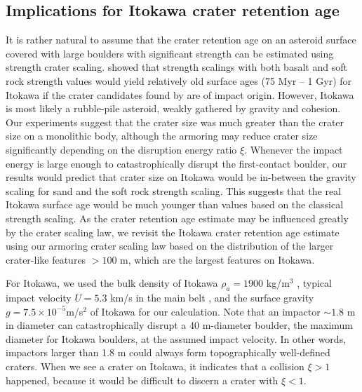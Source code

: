 \documentclass[3p,authoryear]{elsarticle}
\begin{document}
 \subsection{Implications for Itokawa crater retention age}\label{sec:itokawa-age}
It is rather natural to assume that the crater retention age on an asteroid surface covered with large boulders with significant strength can be estimated using strength crater scaling. \citet{michel2009} showed that strength scalings with both basalt and soft rock strength values would yield relatively old surface ages (75 Myr -- 1 Gyr) for Itokawa if the crater candidates found by \citet{hirata2009} are of impact origin.
 However, Itokawa is most likely a rubble-pile asteroid, weakly gathered by gravity and cohesion.
 Our experiments suggest that the crater size was much greater than the crater size on a monolithic body, although the armoring may reduce crater size significantly depending on the disruption energy ratio $\xi$.
 Whenever the impact energy is large enough to catastrophically disrupt the first-contact boulder, our results would predict that crater size on Itokawa would be in-between the gravity scaling for sand and the soft rock strength scaling. This suggests that the real Itokawa surface age would be much younger than values based on the classical strength scaling.
As the crater retention age estimate may be influenced greatly by the crater scaling law, we revisit the Itokawa crater retention age estimate using our armoring crater scaling law based on the distribution of the larger crater-like features $>100$ m, which are the largest features on Itokawa.

For Itokawa, we used the bulk density of Itokawa $\rho_a=1900$ kg/m$^3$ \citep{fujiwara2006}, typical impact velocity $U=5.3$ km/s in the main belt \citep{bottke1994}, and the surface gravity $g=7.5\times 10^{-5}$m/s$^2$ \citep{tancredi2015} of Itokawa for our calculation.
Note that an impactor $\sim 1.8$ m in diameter can catastrophically disrupt a 40 m-diameter boulder, the maximum diameter for Itokawa boulders, at the assumed impact velocity.
In other words, impactors larger than 1.8 m could always form topographically well-defined craters.
When we see a crater on Itokawa, it indicates that a collision $\xi>1$ happened, because it would be difficult to discern a crater with $\xi<1$.
\end{document}
